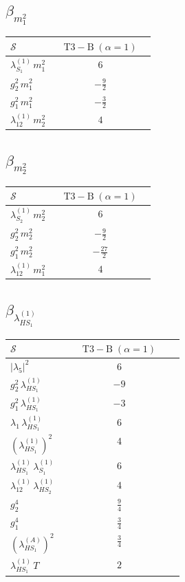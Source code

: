 \documentclass[9pt]{article}
\begin{document}
\subsection*{$ \beta_{m_1^{2}} $}
\begin{longtable}{@{}p{0.31\linewidth}c@{}}
\toprule
$\mathcal{S}$ & $ \mathrm{T3-B}\;(\alpha=1) $ \\
\midrule
$ \lambda_{S_1}^{(1)}\,m_1^{2} $ & $ 6 $ \\
$ g_2^2\,m_1^{2} $ & $ - \frac{9}{2} $ \\
$ g_1^2\,m_1^{2} $ & $ - \frac{3}{2} $ \\
$ \lambda_{12}^{(1)}\,m_2^{2} $ & $ 4 $ \\
\bottomrule
\end{longtable}
\subsection*{$ \beta_{m_2^{2}} $}
\begin{longtable}{@{}p{0.31\linewidth}c@{}}
\toprule
$\mathcal{S}$ & $ \mathrm{T3-B}\;(\alpha=1) $ \\
\midrule
$ \lambda_{S_2}^{(1)}\,m_2^{2} $ & $ 6 $ \\
$ g_2^2\,m_2^{2} $ & $ - \frac{9}{2} $ \\
$ g_1^2\,m_2^{2} $ & $ - \frac{27}{2} $ \\
$ \lambda_{12}^{(1)}\,m_1^{2} $ & $ 4 $ \\
\bottomrule
\end{longtable}
\subsection*{$ \beta_{\lambda_{HS_1}^{(1)}} $}
\begin{longtable}{@{}p{0.31\linewidth}c@{}}
\toprule
$\mathcal{S}$ & $ \mathrm{T3-B}\;(\alpha=1) $ \\
\midrule
$ |\lambda_5|^2 $ & $ 6 $ \\
$ g_2^2\,\lambda_{HS_1}^{(1)} $ & $ -9 $ \\
$ g_1^2\,\lambda_{HS_1}^{(1)} $ & $ -3 $ \\
$ \lambda_1\,\lambda_{HS_1}^{(1)} $ & $ 6 $ \\
$ \left(\lambda_{HS_1}^{(1)}\right)^2 $ & $ 4 $ \\
$ \lambda_{HS_1}^{(1)}\,\lambda_{S_1}^{(1)} $ & $ 6 $ \\
$ \lambda_{12}^{(1)}\,\lambda_{HS_2}^{(1)} $ & $ 4 $ \\
$ g_2^4 $ & $ \frac{9}{4} $ \\
$ g_1^4 $ & $ \frac{3}{4} $ \\
$ \left(\lambda_{HS_1}^{(A)}\right)^2 $ & $ \frac{3}{4} $ \\
$ \lambda_{HS_1}^{(1)}\,T $ & $ 2 $ \\
\bottomrule
\end{longtable}
\end{document}
